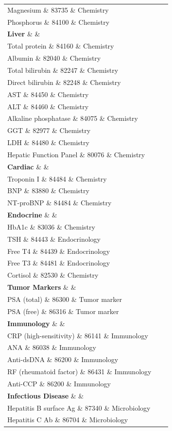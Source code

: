 \begin{longtable}{@{}lll@{}}
Magnesium \& 83735 \& Chemistry \\
Phosphorus \& 84100 \& Chemistry \\
\textbf{Liver} \& \& \\
Total protein \& 84160 \& Chemistry \\
Albumin \& 82040 \& Chemistry \\
Total bilirubin \& 82247 \& Chemistry \\
Direct bilirubin \& 82248 \& Chemistry \\
AST \& 84450 \& Chemistry \\
ALT \& 84460 \& Chemistry \\
Alkaline phosphatase \& 84075 \& Chemistry \\
GGT \& 82977 \& Chemistry \\
LDH \& 84480 \& Chemistry \\
Hepatic Function Panel \& 80076 \& Chemistry \\
\textbf{Cardiac} \& \& \\
Troponin I \& 84484 \& Chemistry \\
BNP \& 83880 \& Chemistry \\
NT-proBNP \& 84484 \& Chemistry \\
\textbf{Endocrine} \& \& \\
HbA1c \& 83036 \& Chemistry \\
TSH \& 84443 \& Endocrinology \\
Free T4 \& 84439 \& Endocrinology \\
Free T3 \& 84481 \& Endocrinology \\
Cortisol \& 82530 \& Chemistry \\
\textbf{Tumor Markers} \& \& \\
PSA (total) \& 86300 \& Tumor marker \\
PSA (free) \& 86316 \& Tumor marker \\
\textbf{Immunology} \& \& \\
CRP (high-sensitivity) \& 86141 \& Immunology \\
ANA \& 86038 \& Immunology \\
Anti-dsDNA \& 86200 \& Immunology \\
RF (rheumatoid factor) \& 86431 \& Immunology \\
Anti-CCP \& 86200 \& Immunology \\
\textbf{Infectious Disease} \& \& \\
Hepatitis B surface Ag \& 87340 \& Microbiology \\
Hepatitis C Ab \& 86704 \& Microbiology \\

\end{longtable}
